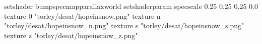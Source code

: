 setshader bumpspecmapparallaxworld
setshaderparam specscale 0.25 0.25 0.25 0.0
texture 0 "torley/desat/hopeinsnow.png"
texture n "torley/desat/hopeinsnow_n.png"
texture s "torley/desat/hopeinsnow_s.png"
texture z "torley/desat/hopeinsnow_z.png"

